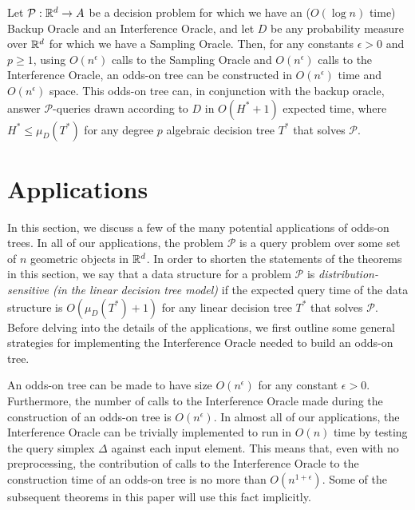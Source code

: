 \documentclass{patmorin}
\begin{document}
\begin{cor}
  Let $\mathcal{P}:\mathbb{R}^d\rightarrow A$ be a decision problem for which we
  have an ($O(\log n)$ time) Backup Oracle and an Interference Oracle,
  and let $D$ be any probability measure over $\mathbb{R}^d$ for which we have a
  Sampling Oracle.  Then, for any constants $\epsilon > 0$ and $p\ge 1$,
  using $O(n^\epsilon)$ calls to the Sampling Oracle and $O(n^\epsilon)$
  calls to the Interference Oracle, an odds-on tree can be constructed in
  $O(n^\epsilon)$ time and $O(n^\epsilon)$ space.  This odds-on tree can,
  in conjunction with the backup oracle, answer $\mathcal{P}$-queries
  drawn according to $D$ in $O(H^*+1)$ expected time, where $H^* \le
  \mu_D(T^*)$ for any degree $p$ algebraic decision tree $T^*$ that
  solves $\mathcal{P}$.
\end{cor}


\section{Applications}

In this section, we discuss a few of the many potential applications of
odds-on trees.  In all of our applications, the problem $\mathcal{P}$ is a
query problem over some set of $n$ geometric objects in $\mathbb{R}^d$.  In order
to shorten the statements of the theorems in this section, we say that a
data structure for a problem $\mathcal{P}$ is \emph{distribution-sensitive
(in the linear decision tree model)} if the expected query time of
the data structure is $O(\mu_D(T^*)+1)$ for any linear decision tree
$T^*$ that solves $\mathcal{P}$. Before delving into the details of the
applications, we first outline some general strategies for implementing
the Interference Oracle needed to build an odds-on tree.

An odds-on tree can be made to have size $O(n^\epsilon)$ for any
constant $\epsilon > 0$.  Furthermore, the number of calls to the
Interference Oracle made during the construction of an odds-on tree is
$O(n^\epsilon)$.  In almost all of our applications, the Interference
Oracle can be trivially implemented to run in $O(n)$ time by testing
the query simplex $\Delta$ against each input element.  This means
that, even with no preprocessing, the contribution of calls to the
Interference Oracle to the construction time of an odds-on tree is no more
than $O(n^{1+\epsilon})$.  Some of the subsequent theorems in this paper
will use this fact implicitly.
\end{document}
